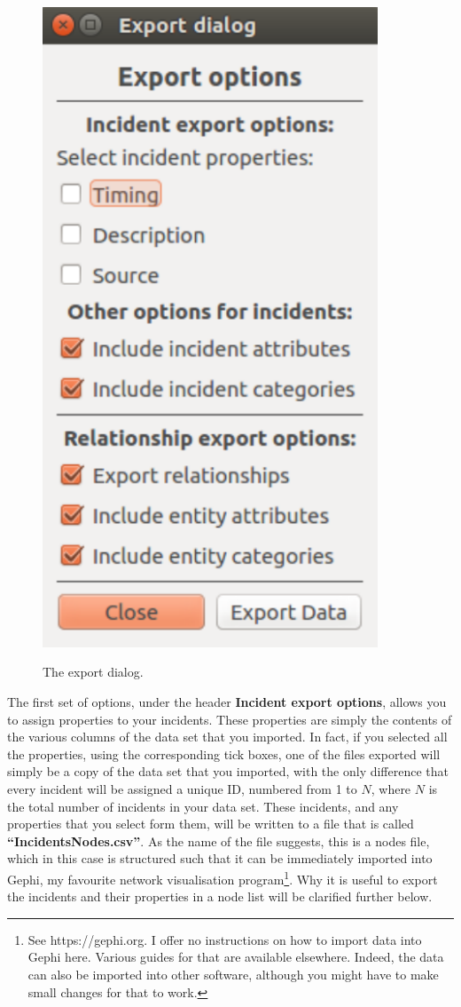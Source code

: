 \documentclass{memoir}
\begin{document}
\begin{figure}[h!]
  \centering
  \caption{The export dialog.}
  \includegraphics[width=100mm]{Screenshot_6.pdf}
  \label{fig:exportdialog}
\end{figure}

The first set of options, under the header \textbf{Incident export options}, allows you to assign properties to your incidents. These properties are simply the contents of the various columns of the data set that you imported. In fact, if you selected all the properties, using the corresponding tick boxes, one of the files exported will simply be a copy of the data set that you imported, with the only difference that every incident will be assigned a unique ID, numbered from 1 to \(N\), where \(N\) is the total number of incidents in your data set. These incidents, and any properties that you select form them, will be written to a file that is called \textbf{``Incidents\textunderscore Nodes.csv''}. As the name of the file suggests, this is a nodes file, which in this case is structured such that it can be immediately imported into Gephi, my favourite network visualisation program\footnote{See https://gephi.org. I offer no instructions on how to import data into Gephi here. Various guides for that are available elsewhere. Indeed, the data can also be imported into other software, although you might have to make small changes for that to work.}. Why it is useful to export the incidents and their properties in a node list will be clarified further below.
\end{document}

